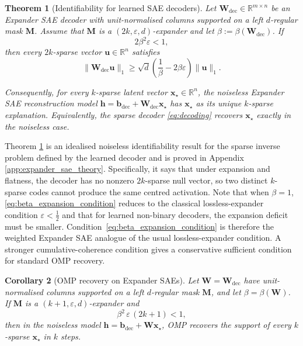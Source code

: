 \documentclass{article}
\theoremstyle{plain}
\newtheorem{theorem}{Theorem}[section]
\newtheorem{corollary}[theorem]{Corollary}
\theoremstyle{definition}
\theoremstyle{remark}
\begin{document}
\begin{theorem}[Identifiability for learned SAE decoders]
\label{thm:expander_sae_recovery}
Let \(\mathbf{W}_{\mathrm{dec}}\in\mathbb{R}^{m\times n}\) be an Expander SAE decoder with unit-normalised columns supported on a left \(d\)-regular mask \(\mathbf{M}\).
%
Assume that \(\mathbf{M}\) is a \((2k,\varepsilon,d)\)-expander and let $\beta := \beta(\mathbf{W}_{\mathrm{dec}})$. 
%
If
\begin{equation}
\label{eq:beta_expansion_condition}
    2\beta^2\varepsilon < 1,
\end{equation}
then every \(2k\)-sparse vector \(\mathbf{u}\in\mathbb{R}^n\) satisfies
\begin{equation}
\label{eq:weighted_expander_lower_bound}
    \|\mathbf{W}_{\mathrm{dec}}\mathbf{u}\|_1
    \ge
    \sqrt d
    \left(
        \frac1\beta - 2\beta\varepsilon
    \right)
    \|\mathbf{u}\|_1 .
\end{equation}

Consequently, for every \(k\)-sparse latent vector \(\mathbf{x}_\star\in\mathbb{R}^n\), the noiseless Expander SAE reconstruction model $\mathbf{h} = \mathbf{b}_{\mathrm{dec}} + \mathbf{W}_{\mathrm{dec}}\mathbf{x}_\star$ has \(\mathbf{x}_\star\) as its unique \(k\)-sparse explanation.
%
Equivalently, the sparse decoder \eqref{eq:decoding} recovers \(\mathbf{x}_\star\) exactly in the noiseless case.
\end{theorem}

%
Theorem \ref{thm:expander_sae_recovery} is an idealised noiseless identifiability result for the sparse inverse problem defined by the learned decoder and is proved in Appendix \ref{app:expander_sae_theory}.
%
Specifically, it says that under expansion and flatness, the decoder has no nonzero \(2k\)-sparse null vector, so two distinct \(k\)-sparse codes cannot produce the same centred activation.
%
Note that when \(\beta=1\), \eqref{eq:beta_expansion_condition} reduces to the classical lossless-expander condition \(\varepsilon<\frac12\) \citep{jafarpour2009efficient} and that for learned non-binary decoders, the expansion deficit must be smaller.
%
Condition~\eqref{eq:beta_expansion_condition} is therefore the weighted Expander SAE analogue of the usual lossless-expander condition.
%
A stronger cumulative-coherence condition gives a conservative sufficient condition for standard OMP recovery.

\begin{corollary}[OMP recovery on Expander SAEs]
\label{cor:omp_main}
Let \(\mathbf{W}=\mathbf{W}_{\mathrm{dec}}\) have unit-normalised columns supported on a left
\(d\)-regular mask \(\mathbf{M}\), and let \(\beta=\beta(\mathbf{W})\). If \(\mathbf{M}\) is a
\((k{+}1,\varepsilon,d)\)-expander and
\[
    \beta^2\,\varepsilon\,(2k{+}1) < 1 ,
\]
then in the noiseless model \(\mathbf{h} = \mathbf{b}_{\mathrm{dec}} + \mathbf{W}\mathbf{x}_\star\),
OMP recovers the support of every \(k\)-sparse \(\mathbf{x}_\star\) in \(k\)
steps.
\end{corollary}
\end{document}
